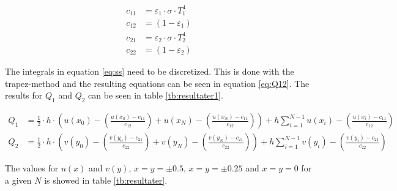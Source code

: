 \begin{equation}
\begin{align*}
{ c }_{ 11 }&={ \varepsilon  }_{ 1 }\cdot \sigma \cdot { T }_{ 1 }^{ 4 }\\ 
{ c }_{ 12 }&=\left( 1-{ \varepsilon  }_{ 1 } \right) \\ 
{ c }_{ 21 }&={ \varepsilon  }_{ 2 }\cdot \sigma \cdot { T }_{ 2 }^{ 4 }\\ 
{ c }_{ 22 }&=\left( 1-{ \varepsilon  }_{ 2 } \right) 
\end{align*}
\label{eq:ad}
\end{equation}

The integrals in equation \ref{eq:ss} need to be discretized. This is done with the trapez-method and the resulting equations can be seen in equation \ref{eq:Q12}. The results for $Q_1$ and $Q_2$ can be seen in table \ref{tb:resultater1}.

\begin{equation}
\begin{align*}
{ Q }_{ 1 }&=\frac { 1 }{ 2 } \cdot h\cdot \left( u\left( { x }_{ 0 } \right) -\left( \frac { u\left( { x }_{ 0 } \right) -{ c }_{ 11 } }{ { c }_{ 12 } }  \right) +u\left( { x }_{ N } \right) -\left( \frac { u\left( { x }_{ N } \right) -{ c }_{ 11 } }{ { c }_{ 12 } }  \right)  \right) +h\sum _{ i=1 }^{ N-1 }{ u\left( { x }_{ i } \right) - } \left( \frac { u\left( { x }_{ i } \right) -{ c }_{ 11 } }{ { c }_{ 12 } }  \right) \\
{ Q }_{ 2 }&=\frac { 1 }{ 2 } \cdot h\cdot \left( v\left( { y }_{ 0 } \right) -\left( \frac { v\left( { y }_{ 0 } \right) -{ c }_{ 21 } }{ { c }_{ 22 } }  \right) +v\left( { y }_{ N } \right) -\left( \frac { v\left( { y }_{ N } \right) -{ c }_{ 21 } }{ { c }_{ 22 } }  \right)  \right) +h\sum _{ i=1 }^{ N-1 }{ v\left( { y }_{ i } \right) - } \left( \frac { v\left( { y }_{ i } \right) -{ c }_{ 21 } }{ { c }_{ 22 } }  \right)  
\end{align*}
\label{eq:Q12}
\end{equation}

The values for \( u\left( x \right)  \) and  \( v\left( y \right)  \), \( x=y= \pm0.5  \), \( x=y= \pm0.25  \) and \( x=y= 0  \)  for a given \( N \) is showed in table \ref{tb:resultater}.

